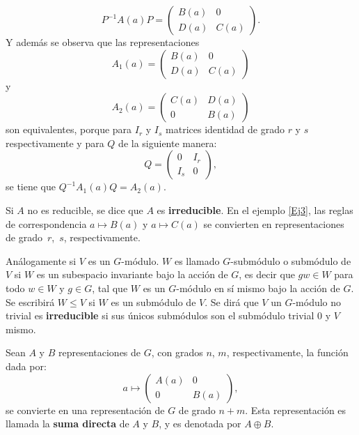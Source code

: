 \documentclass[12pt]{book}
\theoremstyle{definition}
\newcounter{in}
\begin{document}
\begin{equation*}
  P^{-1}A\left(a\right)P=
  \begin{pmatrix}
    B\left(a\right) & 0 \\
    D\left(a\right) & C\left(a\right)
  \end{pmatrix}. 
\end{equation*}  
Y además se observa que las representaciones
\begin{equation*}
  A_{1}\left(a\right)=
  \begin{pmatrix}
    B\left(a\right) & 0 \\
    D\left(a\right) & C\left(a\right)
  \end{pmatrix}
\end{equation*}
y
\begin{equation*} 
   A_{2}\left(a\right)=
  \begin{pmatrix}
    C\left(a\right) & D\left(a\right) \\
    0 & B\left(a\right)
  \end{pmatrix}
\end{equation*}
son equivalentes, porque para $I_{r}$ y $I_{s}$ matrices identidad de
grado $r$ y $s$ respectivamente y para $Q$ de la siguiente manera:
\begin{equation*}
  Q=
  \begin{pmatrix}
    0 & I_{r} \\ 
    I_{s} & 0
  \end{pmatrix},
\end{equation*}
se tiene que $Q^{-1}A_{1}\left(a\right)Q=A_{2}\left(a\right)$.


Si $A$ no es reducible, se dice que $A$ es \textbf{irreducible}. En el ejemplo
\ref{Ej3}, las reglas de correspondencia $a \mapsto B\left(a\right)$ y
$a \mapsto C\left(a\right)$ se convierten en representaciones de
grado~$r$,~$s$, respectivamente.

\begin{mdframed}
  Análogamente si $V$ es un $G$-módulo. $W$ es llamado $G$-submódulo o
  submódulo de $V$ si $W$ es un subespacio invariante bajo la acción
  de $G$, es decir que $gw \in W$ para todo $w \in W$ y $g \in G$, tal
  que $W$ es un $G$-módulo en sí mismo bajo la acción de $G$. Se
  escribirá $W \leq V$ si $W$ es un submódulo de $V$. Se dirá que $V$
  un $G$-módulo no trivial es \textbf{irreducible} si sus únicos submódulos son
  el submódulo trivial $0$ y $V$ mismo. 
\end{mdframed}
 

Sean $A$ y $B$ representaciones de $G$, con grados $n$, $m$,
respectivamente, la función dada por:
\begin{equation*}
  a\mapsto
  \begin{pmatrix}
    A\left(a\right) & 0 \\ 
    0 & B\left(a\right)
  \end{pmatrix}, 
\end{equation*}
se convierte en una representación de $G$ de grado $n+m$. Esta
representación es llamada la \textbf{suma directa} de $A$ y
$B$, y es denotada por $A \oplus B$.
\end{document}
